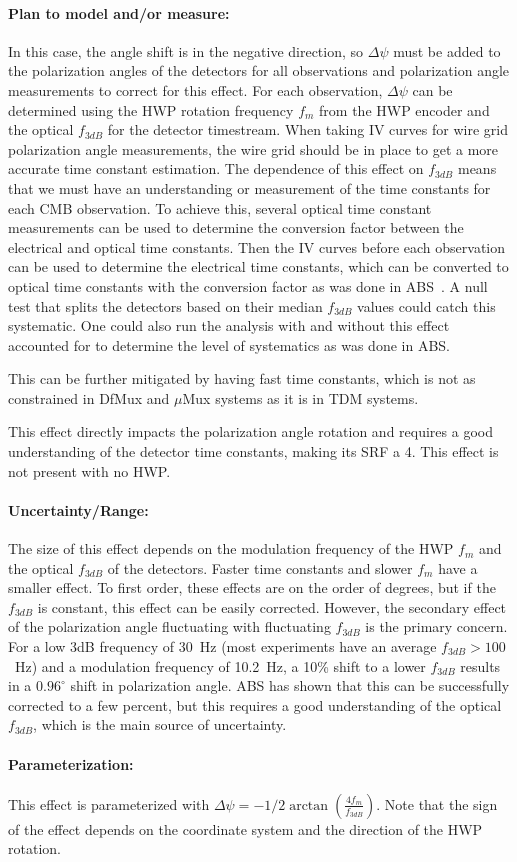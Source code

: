 \paragraph{Plan to model and/or measure:}

In this case, the angle shift is in the negative direction, so $\Delta \psi$ must be added to the polarization angles of the detectors for all observations and polarization angle measurements to correct for this effect. For each observation, $\Delta \psi$ can be determined using the HWP rotation frequency $f_{m}$ from the HWP encoder and the optical $f_{3dB}$ for the detector timestream. When taking IV curves for wire grid polarization angle measurements, the wire grid should be in place to get a more accurate time constant estimation. The dependence of this effect on $f_{3dB}$ means that we must have an understanding or measurement of the time constants for each CMB observation. To achieve this, several optical time constant measurements can be used to determine the conversion factor between the electrical and optical time constants. Then the IV curves before each observation can be used to determine the electrical time constants, which can be converted to optical time constants with the conversion factor as was done in ABS~\cite{Simon_Thesis_2016}. A null test that splits the detectors based on their median $f_{3dB}$ values could catch this systematic. One could also run the analysis with and without this effect accounted for to determine the level of systematics as was done in ABS.

This can be further mitigated by having fast time constants, which is not as constrained in DfMux and $\mu$Mux systems as it is in TDM systems.

This effect directly impacts the polarization angle rotation and requires a good understanding of the detector time constants, making its SRF a 4. This effect is not present with no HWP.

\paragraph{Uncertainty/Range:}
The size of this effect depends on the modulation frequency of the HWP $f_{m}$ and the optical $f_{3dB}$ of the detectors. Faster time constants and slower $f_{m}$ have a smaller effect. To first order, these effects are on the order of degrees, but if the $f_{3dB}$ is constant, this effect can be easily corrected. However, the secondary effect of the polarization angle fluctuating with fluctuating $f_{3dB}$ is the primary concern. For a low 3dB frequency of 30~Hz (most experiments have an average $f_{3dB}>100$~Hz) and a modulation frequency of 10.2~Hz, a 10\% shift to a lower $f_{3dB}$ results in a $0.96^{\circ}$ shift in polarization angle. ABS has shown that this can be successfully corrected to a few percent, but this requires a good understanding of the optical $f_{3dB}$, which is the main source of uncertainty.

\paragraph{Parameterization:}
This effect is parameterized with $\Delta \psi=-1/2\arctan{\left(\frac{4f_{m}}{f_{3dB}}\right)}$. Note that the sign of the effect depends on the coordinate system and the direction of the HWP rotation.
